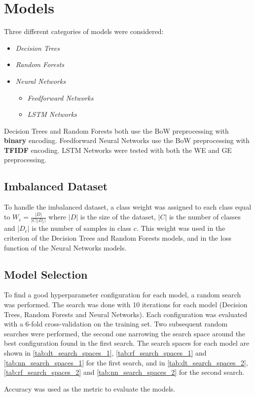 \section{Models}
Three different categories of models were
considered:
\begin{itemize}
    \item \textit{Decision Trees}
    \item \textit{Random Forests}
    \item \textit{Neural Networks}
    \begin{itemize}
        \item \textit{Feedforward Networks}
        \item \textit{LSTM Networks}
    \end{itemize}
\end{itemize}
Decision Trees and Random Forests both use
the BoW preprocessing with \textbf{binary} 
encoding.
Feedforward Neural Networks use the BoW
preprocessing with \textbf{TFIDF} encoding.
LSTM Networks were tested with both the
WE and GE preprocessing.

\subsection{Imbalanced Dataset}
To handle the imbalanced dataset, a class
weight was assigned to each class equal to
$W_c=\frac{|D|}{|C||D_c|}$ where $|D|$ is
the size of the dataset, $|C|$ is the number
of classes and $|D_c|$ is the number of
samples in class $c$. This weight was used in
the criterion of the Decision Trees and Random
Forests models, and in the loss function of
the Neural Networks models.

\subsection{Model Selection}
To find a good hyperparameter configuration
for each model, a random search was performed.
The search was done with 10 iterations for
each model (Decision Trees, Random Forests 
and Neural Networks). Each configuration was
evaluated with a 6-fold cross-validation on
the training set. Two subsequent random
searches were performed, the second one
narrowing the search space around the best
configuration found in the first search.
The search spaces for each model are shown
in \autoref{tab:dt_search_spaces_1}, 
\autoref{tab:rf_search_spaces_1} and 
\autoref{tab:nn_search_spaces_1} for the 
first search, and in 
\autoref{tab:dt_search_spaces_2},
\autoref{tab:rf_search_spaces_2} and
\autoref{tab:nn_search_spaces_2} for the
second search.



Accuracy was used as the metric to evaluate
the models.
